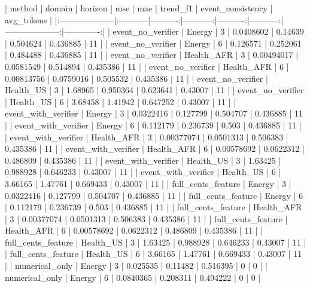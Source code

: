 {{{{{{{{| method              | domain     |   horizon |        mse |       mae |   trend_f1 |   event_consistency |   avg_tokens |
|:--------------------|:-----------|----------:|-----------:|----------:|-----------:|--------------------:|-------------:|
| event_no_verifier   | Energy     |         3 | 0.0408602  | 0.14639   |   0.504624 |            0.436885 |           11 |
| event_no_verifier   | Energy     |         6 | 0.126571   | 0.252061  |   0.484488 |            0.436885 |           11 |
| event_no_verifier   | Health_AFR |         3 | 0.00494017 | 0.0581549 |   0.514894 |            0.435386 |           11 |
| event_no_verifier   | Health_AFR |         6 | 0.00813756 | 0.0759016 |   0.505532 |            0.435386 |           11 |
| event_no_verifier   | Health_US  |         3 | 1.68965    | 0.950364  |   0.623641 |            0.43007  |           11 |
| event_no_verifier   | Health_US  |         6 | 3.68458    | 1.41942   |   0.647252 |            0.43007  |           11 |
| event_with_verifier | Energy     |         3 | 0.0322416  | 0.127799  |   0.504707 |            0.436885 |           11 |
| event_with_verifier | Energy     |         6 | 0.112179   | 0.236739  |   0.503    |            0.436885 |           11 |
| event_with_verifier | Health_AFR |         3 | 0.00377074 | 0.0501313 |   0.506383 |            0.435386 |           11 |
| event_with_verifier | Health_AFR |         6 | 0.00578692 | 0.0622312 |   0.486809 |            0.435386 |           11 |
| event_with_verifier | Health_US  |         3 | 1.63425    | 0.988928  |   0.646233 |            0.43007  |           11 |
| event_with_verifier | Health_US  |         6 | 3.66165    | 1.47761   |   0.669433 |            0.43007  |           11 |
| full_cents_feature  | Energy     |         3 | 0.0322416  | 0.127799  |   0.504707 |            0.436885 |           11 |
| full_cents_feature  | Energy     |         6 | 0.112179   | 0.236739  |   0.503    |            0.436885 |           11 |
| full_cents_feature  | Health_AFR |         3 | 0.00377074 | 0.0501313 |   0.506383 |            0.435386 |           11 |
| full_cents_feature  | Health_AFR |         6 | 0.00578692 | 0.0622312 |   0.486809 |            0.435386 |           11 |
| full_cents_feature  | Health_US  |         3 | 1.63425    | 0.988928  |   0.646233 |            0.43007  |           11 |
| full_cents_feature  | Health_US  |         6 | 3.66165    | 1.47761   |   0.669433 |            0.43007  |           11 |
| numerical_only      | Energy     |         3 | 0.025535   | 0.11482   |   0.516395 |            0        |            0 |
| numerical_only      | Energy     |         6 | 0.0840365  | 0.208311  |   0.494222 |            0        |            0 |

}}}}}}}}
